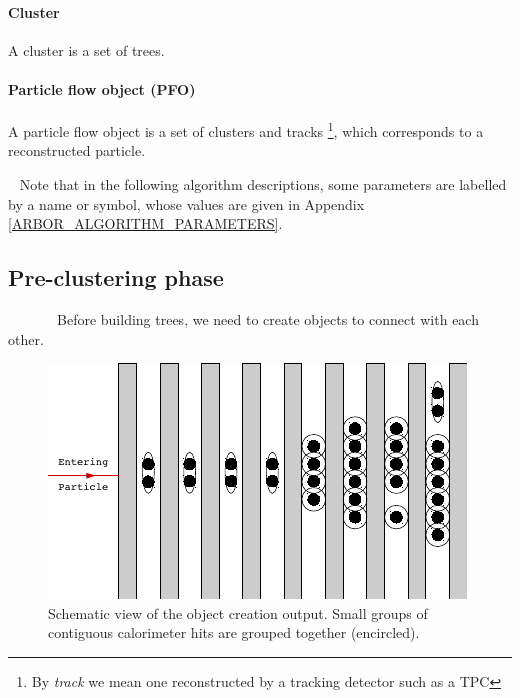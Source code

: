 \documentclass[cits]{JINST}
\begin{document}
\paragraph*{Cluster} A cluster is a set of trees.

\paragraph*{Particle flow object (PFO)} A particle flow object is a set of clusters and tracks \footnote{By \textit{track} we mean one reconstructed by a tracking detector such as a TPC}, which corresponds to a reconstructed particle.

~\newline 
Note that in the following algorithm descriptions, some parameters are labelled by a name or symbol, whose values are given in Appendix \ref{ARBOR_ALGORITHM_PARAMETERS}.

\subsection{Pre-clustering phase} 

~~~~~~~Before building trees, we need to create objects to connect with each other.

\begin{figure}
  \vspace{-20pt}
  \begin{center}
    \includegraphics[width=\linewidth]{ObjectCreationAfter.pdf}
  \end{center}
  \vspace{-10pt}
  \caption{\label{ARBOR_OBJECT_CREATION} Schematic view of the object creation output. Small groups of contiguous calorimeter hits are grouped together (encircled).}
  \vspace{-20pt}
\end{figure}
\end{document}
